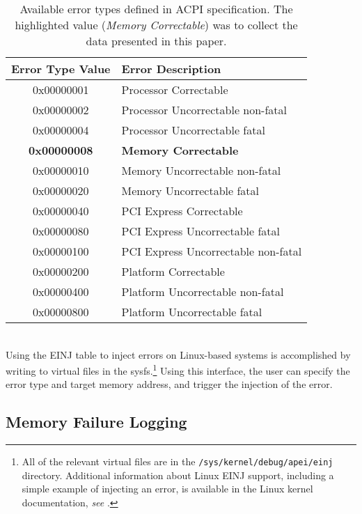 \begin{table}
\centering
\begin{tabular}{ c l }
\toprule
Error Type Value & Error Description \\
\midrule
 0x00000001 & Processor Correctable\\
 0x00000002 & Processor Uncorrectable non-fatal \\
 0x00000004 & Processor Uncorrectable fatal \\
        {\bf{0x00000008}} & {\bf{Memory Correctable}} \\
 0x00000010 & Memory Uncorrectable non-fatal \\
 0x00000020 & Memory Uncorrectable fatal \\
 0x00000040 & PCI Express Correctable \\
 0x00000080 & PCI Express Uncorrectable fatal \\
 0x00000100 & PCI Express Uncorrectable non-fatal \\
 0x00000200 & Platform Correctable \\
 0x00000400 & Platform Uncorrectable non-fatal \\
 0x00000800 & Platform Uncorrectable fatal \\
\bottomrule
\end{tabular}
\vspace{.6em}
\caption{
        Available error types defined in ACPI specification.  The highlighted value
        (\emph{Memory Correctable}) was to collect the data presented in this paper.
}
\label{tab:einj}
\end{table}

\\
Using the EINJ table to inject errors on Linux-based systems is accomplished by writing to virtual 
files in the sysfs.\footnote{All of the relevant virtual files are in the \texttt{/sys/kernel/debug/apei/einj}
directory.  Additional information about Linux EINJ support, including a simple example of injecting an
error, is available in the Linux kernel documentation, \emph{see} \cite{einj_web}.} Using this interface, 
the user can specify the error type and target memory address, and trigger the injection of the error.

\subsection{Memory Failure Logging}
\label{sec:approach:logging}

